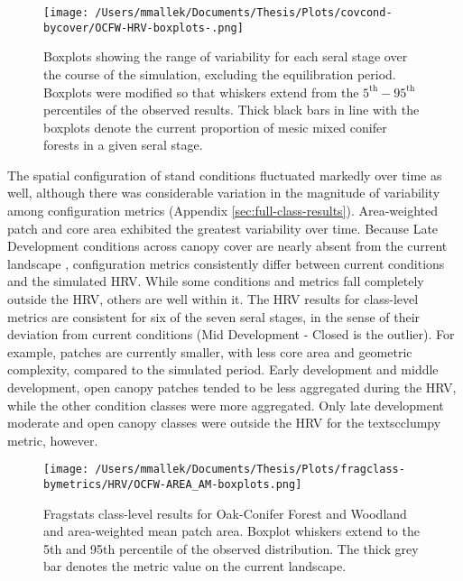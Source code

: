 \begin{figure}[!htbp]
  \centering
    \texttt{[image: /Users/mmallek/Documents/Thesis/Plots/covcond-bycover/OCFW-HRV-boxplots-.png]}
  \caption{Boxplots showing the range of variability for each seral stage over the course of the simulation, excluding the equilibration period. Boxplots were modified so that whiskers extend from the $5^{\text{th}} - 95^{\text{th}}$ percentiles of the observed results. Thick black bars in line with the boxplots denote the current proportion of mesic mixed conifer forests in a given seral stage.} 
  \label{fig:covcond_ocfw_boxplots}
\end{figure}

The spatial configuration of stand conditions fluctuated markedly over time as well, although there was considerable variation in the magnitude of variability among configuration metrics (Appendix \ref{sec:full-class-results}). Area-weighted patch and core area exhibited the greatest variability over time. Because Late Development conditions across canopy cover are nearly absent from the current landscape , configuration metrics consistently differ between current conditions and the simulated HRV. While some conditions and metrics fall completely outside the HRV, others are well within it. The HRV results for class-level metrics are consistent for six of the seven seral stages, in the sense of their deviation from current conditions (Mid Development - Closed is the outlier). For example, patches are currently smaller, with less core area and geometric complexity, compared to the simulated period. Early development and middle development, open canopy patches tended to be less aggregated during the HRV, while the other condition classes were more aggregated. Only late development moderate and open canopy classes were outside the HRV for the textsc{clumpy} metric, however.


\begin{figure}[!htbp]
\centering
    \texttt{[image: /Users/mmallek/Documents/Thesis/Plots/fragclass-bymetrics/HRV/OCFW-AREA\_AM-boxplots.png]}
  \caption{Fragstats class-level results for Oak-Conifer Forest and Woodland and area-weighted mean patch area. Boxplot whiskers extend to the 5th and 95th percentile of the observed distribution. The thick grey bar denotes the metric value on the current landscape.}
  \label{fig:ocfw_areaam}
\end{figure}


